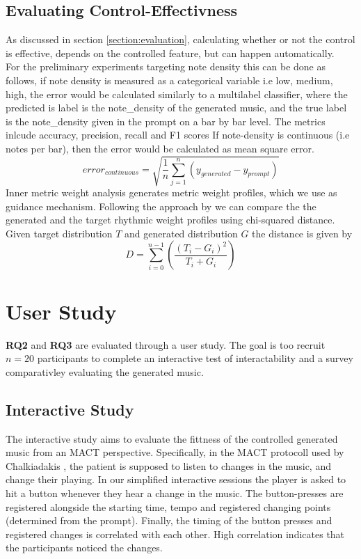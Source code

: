 \subsection{Evaluating Control-Effectivness}
As discussed in section \ref{section:evaluation}, calculating whether or not the control is effective, depends on the controlled feature, but can happen automatically. \\
For the preliminary experiments targeting note density this can be done as follows, if note density is measured as a categorical variable i.e low, medium, high, the error would be calculated similarly to a multilabel classifier, where the predicted is label is the note_density of the generated music, and the true label is the note_density given in the prompt on a bar by bar level. The metrics inlcude accuracy, precision, recall and F1 scores If note-density is continuous (i.e notes per bar), then the error would be calculated as mean square error. \\
\[
error_{continuous} = \sqrt{\frac{1}{n}\sum_{j=1}^{n}(y_{generated}-y_{prompt})}
\]
Inner metric weight analysis generates metric weight profiles, which we use as guidance mechanism. Following the approach by \cite{Bemman2024} we can compare the the generated and the target rhythmic weight profiles using chi-squared distance.
Given target distribution $T$ and generated distribution $G$ the distance is given by 
\[
D=\sum_{i=0}^{n-1}\left(\frac{(T_i-G_i)^2}{T_i+G_i}\right)
\]

\section{User Study}
\textbf{RQ2} and \textbf{RQ3} are evaluated through a user study. The goal is too recruit $n=20$ participants to complete an interactive test of interactability and a survey comparativley evaluating the generated music. 
\subsection{Interactive Study}
The interactive study aims to evaluate the fittness of the controlled generated music from an MACT perspective. Specifically, in the MACT protocoll used by Chalkiadakis \cite{Chalkiadakis_2022}, the patient is supposed to listen to changes in the music, and change their playing. In our simplified interactive sessions the player is asked to hit a button whenever they hear a change in the music. The button-presses are registered alongside the starting time, tempo and registered changing points (determined from the prompt). Finally, the timing of the button presses and registered changes is correlated with each other. High correlation indicates that the participants noticed the changes. 

